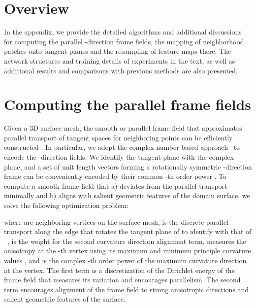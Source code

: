 \documentclass[10pt,twocolumn,letterpaper]{article}
\begin{document}
{\small


}

\newpage
\clearpage

\appendix

\section{Overview}

In the appendix, we provide the detailed algorithms and additional discussions for computing the parallel -direction frame fields, the mapping of neighborhood patches onto tangent planes and the resampling of feature maps there. 
The network structures and training details of experiments in the text, as well as additional results and comparisons with previous methods are also presented.


\section{Computing the parallel frame fields}
\label{appn:smooth_field}

Given a 3D surface mesh, the smooth or parallel frame field that approximates parallel transport of tangent spaces for neighboring points can be efficiently constructed \cite{DirFieldEG2016}.
In particular, we adopt the complex number based approach~\cite{Knoppel:2013:GOD,Diamanti:2014:PolyVector} to encode the -direction fields.
We identify the tangent plane  with the complex plane, and a set of unit length vectors  forming a rotationally symmetric -direction frame can be conveniently encoded by their common -th order power . 
To compute a smooth frame field that a) deviates from the parallel transport minimally and b) aligns with salient geometric features of the domain surface, we solve the following optimization problem:

where  are neighboring vertices on the surface mesh,  is the discrete parallel transport along the edge  that rotates the tangent plane of  to identify with that of ~\cite{Knoppel:2013:GOD},  is the weight for the second curvature direction alignment term,  measures the anisotropy at the -th vertex using its maximum and minimum principle curvature values , and  is the complex -th order power of the maximum curvature direction at the vertex.
The first term is a discretization of the Dirichlet energy of the frame field that measures its variation and encourages parallelism.
The second term encourages alignment of the frame field to strong anisotropic directions and salient geometric features of the surface.
\end{document}
